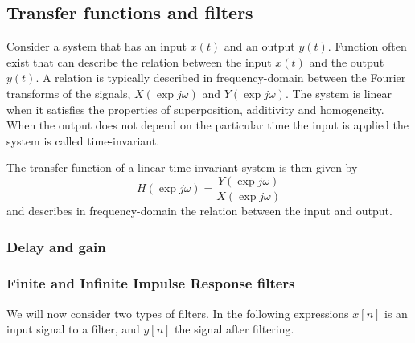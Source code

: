

\subsection{Transfer functions and filters}
Consider a system that has an input $x(t)$ and an output $y(t)$. Function often
exist that can describe the relation between the input $x(t)$ and the output
$y(t)$. A relation is typically described in frequency-domain between the
Fourier transforms of the signals, $X(\exp{j\omega})$ and $Y(\exp{j\omega})$.
The system is linear when it satisfies the properties of superposition,
additivity and homogeneity. When the output does not depend on the particular
time the input is applied the system is called time-invariant.

The transfer function of a linear time-invariant system is then given by
\begin{equation}
  H(\exp{j\omega}) = \frac{Y(\exp{j\omega})}{X(\exp{j\omega})}
\end{equation}
and describes in frequency-domain the relation between the input and output.

%
%
%




\subsubsection{Delay and gain}


\subsubsection{Finite and Infinite Impulse Response filters}
We will now consider two types of filters. In the following expressions $x[n]$ is an input signal to a filter, and $y[n]$ the signal after filtering.


